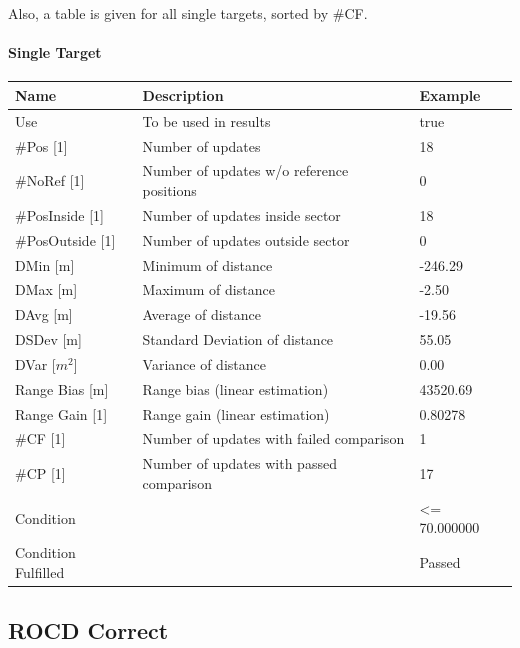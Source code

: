 Also, a table is given for all single targets, sorted by \#CF.

\paragraph{Single Target}

\begin{center}
 \begin{table}[H]
  \begin{tabularx}{\textwidth}{ | l | X |  l | }
    \hline
    \textbf{Name} & \textbf{Description} & \textbf{Example} \\ \hline
    Use & To be used in results & true \\ \hline
    \#Pos [1] & Number of updates & 18 \\ \hline
    \#NoRef [1] & Number of updates w/o reference positions & 0 \\ \hline
    \#PosInside [1] & Number of updates inside sector & 18 \\ \hline
    \#PosOutside [1] & Number of updates outside sector & 0 \\ \hline
    DMin [m] & Minimum of distance & -246.29 \\ \hline
    DMax [m] & Maximum of distance & -2.50 \\ \hline
    DAvg [m] & Average of distance & -19.56 \\ \hline
    DSDev [m] & Standard Deviation of distance & 55.05 \\ \hline
    DVar [$m^2$] & Variance of distance & 0.00 \\ \hline
    Range Bias [m] & Range bias (linear estimation) & 43520.69 \\ \hline
    Range Gain [1] & Range gain (linear estimation) & 0.80278 \\ \hline
    \#CF [1] & Number of updates with failed comparison & 1 \\ \hline
    \#CP [1] & Number of updates with passed comparison & 17 \\ \hline
    Condition &  & <= 70.000000 \\ \hline
    Condition Fulfilled &  & Passed \\ \hline
\end{tabularx}
\end{table}
\end{center}

\subsection{ROCD Correct}
\label{sec:eval_req_rocd_correct} 

